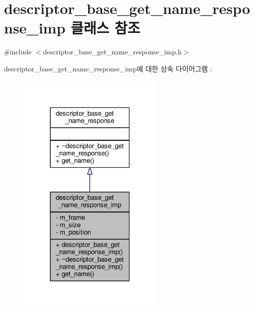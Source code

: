 \hypertarget{classavdecc__lib_1_1descriptor__base__get__name__response__imp}{}\section{descriptor\+\_\+base\+\_\+get\+\_\+name\+\_\+response\+\_\+imp 클래스 참조}
\label{classavdecc__lib_1_1descriptor__base__get__name__response__imp}


{\ttfamily \#include $<$descriptor\+\_\+base\+\_\+get\+\_\+name\+\_\+response\+\_\+imp.\+h$>$}



descriptor\+\_\+base\+\_\+get\+\_\+name\+\_\+response\+\_\+imp에 대한 상속 다이어그램 \+: 
\nopagebreak
\begin{figure}[H]
\begin{center}
\leavevmode
\includegraphics[width=199pt]{classavdecc__lib_1_1descriptor__base__get__name__response__imp__inherit__graph}
\end{center}
\end{figure}


